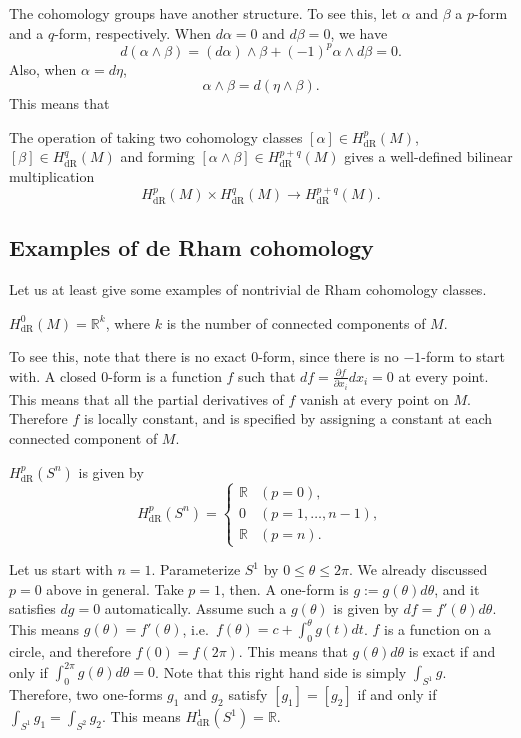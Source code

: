 \documentclass[12pt]{article}
\numberwithin{equation}{section}
\theoremstyle{remark}
\def\bR{\mathbb{R}}
\begin{document}
The cohomology groups have another structure.
To see this, let $\alpha$ and $\beta$ a $p$-form and a $q$-form, respectively.
When $d\alpha=0$ and $d\beta=0$, we have \begin{equation}
d(\alpha \wedge \beta)=(d\alpha)\wedge \beta + (-1)^p\alpha \wedge  d\beta =0.
\end{equation}
Also, when $\alpha=d\eta$, \begin{equation}
\alpha\wedge \beta=d(\eta\wedge \beta).
\end{equation}
This means that 
\begin{proposition}
The operation of taking two cohomology classes
$[\alpha] \in H^p_\text{dR}(M)$,
$[\beta] \in H^q_\text{dR}(M)$ 
and forming $[\alpha\wedge \beta] \in H^{p+q}_\text{dR}(M)$ gives a
well-defined bilinear multiplication \begin{equation}
H^p_\text{dR}(M) \times H^q_\text{dR}(M)
\to H^{p+q}_\text{dR}(M).
\end{equation}
\end{proposition}




\subsection{Examples of de Rham cohomology}
Let us at least  give some examples of nontrivial de Rham cohomology classes.

\begin{proposition}
$H^0_\text{dR}(M)=\bR^k$,
where $k$ is the number of connected components of $M$.
\end{proposition}
To see this, note that there is no exact $0$-form, since there is no $-1$-form to start with.
A closed $0$-form is a function $f$ such that $df= \frac{\partial f}{\partial x_i}dx_i=0$ at every point.
This means that all the partial derivatives of $f$ vanish at every point on $M$.
Therefore $f$ is locally constant,
and is specified by assigning a constant at each connected component of $M$.

\begin{example}
$H^p_\text{dR}(S^n)$ is given by \[
H^p_\text{dR}(S^n)= \begin{cases}
\bR & (p=0),\\
0 & (p=1,\ldots, n-1),\\
\bR & (p=n).
\end{cases}
\]
\end{example}

Let us start with $n=1$. Parameterize $S^1$ by $0\le \theta \le 2\pi$.
We already discussed $p=0$ above in general.
Take $p=1$, then. A one-form is $g:=g(\theta)d\theta$, and it satisfies $dg=0$ automatically.
Assume such a $g(\theta)$ is given by $df=f'(\theta) d\theta$.
This means $g(\theta)=f'(\theta)$, i.e.~$f(\theta)=c+ \int_0^\theta g(t)dt$.
$f$ is a function on a circle, and therefore $f(0)=f(2\pi)$.
This means that $g(\theta)d\theta$ is exact if and only if $\int_0^{2\pi} g(\theta)d\theta=0$.
Note that this right hand side is simply $\int_{S^1} g$.
Therefore, two one-forms $g_1$ and $g_2$ satisfy $[g_1]=[g_2]$ if and only if $\int_{S^1} g_1=\int_{S^2}g_2$.
This means $H^1_\text{dR}(S^1)=\bR$.
\end{document}
